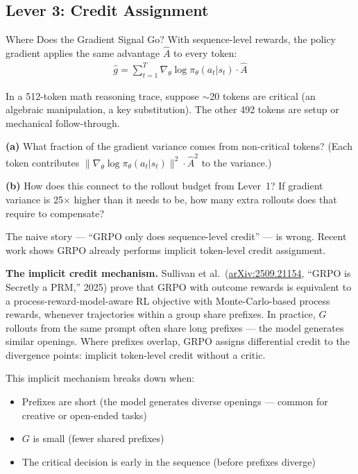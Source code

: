 \subsection{Lever 3: Credit Assignment}

\begin{thinkfirst}{Where Does the Gradient Signal Go?}
With sequence-level rewards, the policy gradient applies the same advantage $\hat{A}$ to every token:
\begin{align*}
  \hat{g} = \sum_{t=1}^{T} \nabla_\theta \log \pi_\theta(a_t | s_t) \cdot \hat{A}
\end{align*}

In a 512-token math reasoning trace, suppose $\sim$20 tokens are critical (an algebraic manipulation, a key substitution). The other 492 tokens are setup or mechanical follow-through.

\textbf{(a)} What fraction of the gradient variance comes from non-critical tokens? (Each token contributes $\|\nabla_\theta \log \pi_\theta(a_t | s_t)\|^2 \cdot \hat{A}^2$ to the variance.)

\textbf{(b)} How does this connect to the rollout budget from Lever~1? If gradient variance is 25$\times$ higher than it needs to be, how many extra rollouts does that require to compensate?
\end{thinkfirst}

The naive story --- ``GRPO only does sequence-level credit'' --- is wrong. Recent work shows GRPO already performs implicit token-level credit assignment.

\textbf{The implicit credit mechanism.} Sullivan et al.\ (\href{https://arxiv.org/abs/2509.21154}{arXiv:2509.21154}, ``GRPO is Secretly a PRM,'' 2025) prove that GRPO with outcome rewards is equivalent to a process-reward-model-aware RL objective with Monte-Carlo-based process rewards, whenever trajectories within a group share prefixes. In practice, $G$ rollouts from the same prompt often share long prefixes --- the model generates similar openings. Where prefixes overlap, GRPO assigns differential credit to the divergence points: implicit token-level credit without a critic.

This implicit mechanism breaks down when:
\begin{itemize}
  \item Prefixes are short (the model generates diverse openings --- common for creative or open-ended tasks)
  \item $G$ is small (fewer shared prefixes)
  \item The critical decision is early in the sequence (before prefixes diverge)
\end{itemize}

